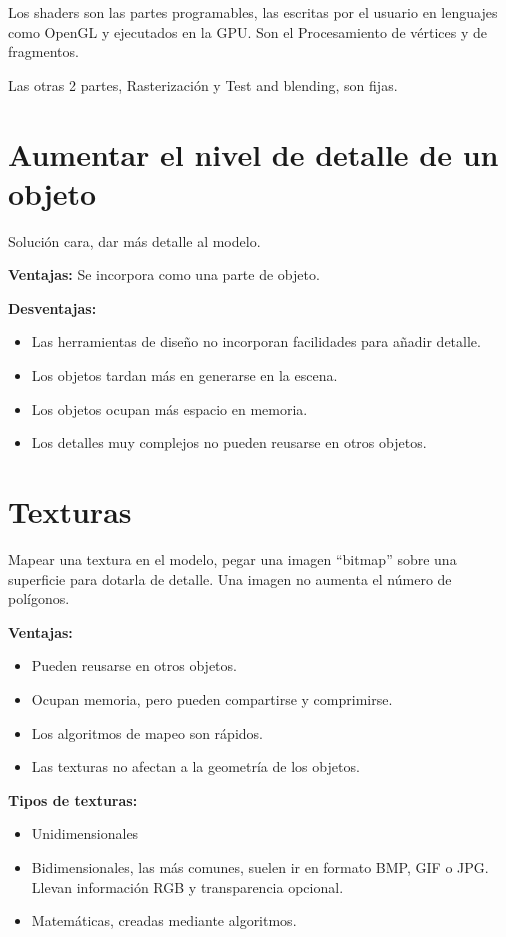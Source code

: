 Los shaders son las partes programables, las escritas por el usuario en lenguajes como OpenGL y ejecutados en la GPU. Son el Procesamiento de vértices y de fragmentos.

Las otras 2 partes, Rasterización y Test and blending, son fijas.

\section{Aumentar el nivel de detalle de un objeto}
Solución cara, dar más detalle al modelo.

\textbf{Ventajas:} Se incorpora como una parte de objeto.

\textbf{Desventajas:}
\begin{itemize}
	\item Las herramientas de diseño no incorporan facilidades para añadir detalle.
	\item Los objetos tardan más en generarse en la escena.
	\item Los objetos ocupan más espacio en memoria.
	\item Los detalles muy complejos no pueden reusarse en otros objetos.
\end{itemize}

\section{Texturas}

Mapear una textura en el modelo, pegar una imagen \enquote{bitmap} sobre una superficie para dotarla de detalle. Una imagen no aumenta el número de polígonos.

\textbf{Ventajas:}
\begin{itemize}
	\item Pueden reusarse en otros objetos.
	\item Ocupan memoria, pero pueden compartirse y comprimirse.
	\item Los algoritmos de mapeo son rápidos.
	\item Las texturas no afectan a la geometría de los objetos.
\end{itemize}

\textbf{Tipos de texturas:}
\begin{itemize}
	\item Unidimensionales
	\item Bidimensionales, las más comunes, suelen ir en formato BMP, GIF o JPG. Llevan información RGB y transparencia opcional.
	\item Matemáticas, creadas mediante algoritmos.
\end{itemize}

